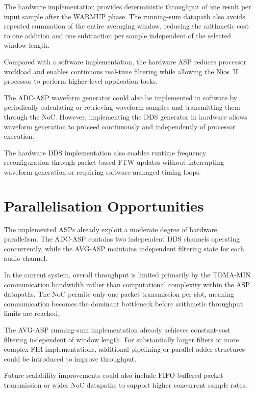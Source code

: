 \documentclass[10pt, a4paper]{article}
\begin{document}
The hardware implementation provides deterministic throughput of one result per input sample after the WARMUP phase. The running-sum datapath also avoids repeated summation of the entire averaging window, reducing the arithmetic cost to one addition and one subtraction per sample independent of the selected window length.

Compared with a software implementation, the hardware ASP reduces processor workload and enables continuous real-time filtering while allowing the Nios~II processor to perform higher-level application tasks.

The ADC-ASP waveform generator could also be implemented in software by periodically calculating or retrieving waveform samples and transmitting them through the NoC. However, implementing the DDS generator in hardware allows waveform generation to proceed continuously and independently of processor execution.

The hardware DDS implementation also enables runtime frequency reconfiguration through packet-based FTW updates without interrupting waveform generation or requiring software-managed timing loops.

\section{Parallelisation Opportunities}
\label{sec:parallelisation}

The implemented ASPs already exploit a moderate degree of hardware parallelism. The ADC-ASP contains two independent DDS channels operating concurrently, while the AVG-ASP maintains independent filtering state for each audio channel.

In the current system, overall throughput is limited primarily by the TDMA-MIN communication bandwidth rather than computational complexity within the ASP datapaths. The NoC permits only one packet transmission per slot, meaning communication becomes the dominant bottleneck before arithmetic throughput limits are reached.

The AVG-ASP running-sum implementation already achieves constant-cost filtering independent of window length. For substantially larger filters or more complex FIR implementations, additional pipelining or parallel adder structures could be introduced to improve throughput.

Future scalability improvements could also include FIFO-buffered packet transmission or wider NoC datapaths to support higher concurrent sample rates.
\end{document}
